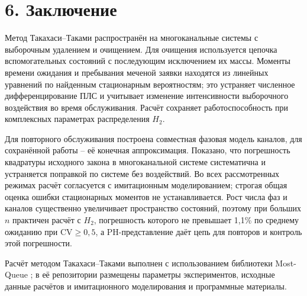 \section*{6. Заключение}
Метод Такахаси--Таками распространён на многоканальные системы с выборочным удалением и очищением. Для очищения используется цепочка вспомогательных состояний с последующим исключением их массы. Моменты времени ожидания и пребывания меченой заявки находятся из линейных уравнений по найденным стационарным вероятностям; это устраняет численное дифференцирование ПЛС и учитывает изменение интенсивности выборочного воздействия во время обслуживания. Расчёт сохраняет работоспособность при комплексных параметрах распределения \(H_2\).

Для повторного обслуживания построена совместная фазовая модель каналов, для сохранённой работы -- её конечная аппроксимация. Показано, что погрешность квадратуры исходного закона в многоканальной системе систематична и устраняется поправкой по системе без воздействий. Во всех рассмотренных режимах расчёт согласуется с имитационным моделированием; строгая общая оценка ошибки стационарных моментов не устанавливается. Рост числа фаз и каналов существенно увеличивает пространство состояний, поэтому при больших \(n\) практичен расчёт с \(H_2\), погрешность которого не превышает 1,1\% по среднему ожиданию при \(\mathrm{CV}\ge0{,}5\), а PH-представление даёт цепь для повторов и контроль этой погрешности.

Расчёт методом Такахаси--Таками выполнен с использованием библиотеки Most-Queue \cite{mostqueue2026}; в её репозитории размещены параметры экспериментов, исходные данные расчётов и имитационного моделирования и программные материалы.


